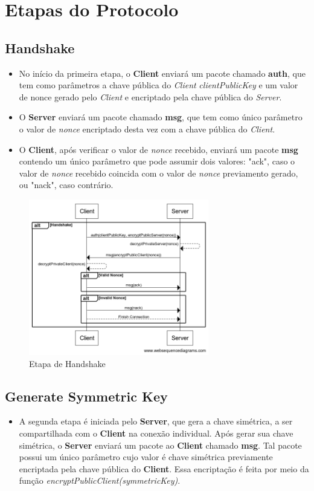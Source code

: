 \documentclass[10pt]{article}
\begin{document}
\section{Etapas do Protocolo}
    \subsection{Handshake}
    \begin{itemize}
    \item No início da primeira etapa, o \textbf{Client} enviará um pacote chamado \textbf{auth}, que tem como parâmetros a chave pública do \textit{Client} \textit{clientPublicKey} e um valor de nonce gerado pelo \textit{Client} e encriptado pela chave pública do \textit{Server}.
    \item O \textbf{Server} enviará um pacote chamado \textbf{msg}, que tem como único parâmetro o valor de \textit{nonce} encriptado desta vez com a chave pública do \textit{Client}.
    \item O \textbf{Client}, após verificar o valor de \textit{nonce} recebido, enviará um pacote \textbf{msg} contendo um único parâmetro que pode assumir dois valores: "ack", caso o valor de \textit{nonce} recebido coincida com o valor de \textit{nonce} previamento gerado, ou "nack", caso contrário.
    \end{itemize}
    
    \begin{figure}[ht]
    \centerline{\includegraphics[width=0.7\textwidth]{diagrama/handshake.png}}
    \caption{Etapa de Handshake}
    \label{fig:handshake}
    \end{figure}
    
    \subsection{Generate Symmetric Key}
    \begin{itemize}
    \item A segunda etapa é iniciada pelo \textbf{Server}, que gera a chave simétrica, a ser compartilhada com o \textbf{Client} na conexão individual. Após gerar sua chave simétrica, o \textbf{Server} enviará um pacote ao \textbf{Client} chamado \textbf{msg}. Tal pacote possui um único parâmetro cujo valor é chave simétrica previamente encriptada pela chave pública do \textbf{Client}. Essa encriptação é feita por meio da função \textit{encryptPublicClient(symmetricKey)}.
    \end{itemize}
    
\end{document}
